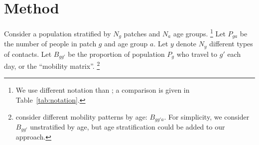 \section{Method}\label{meth}
Consider a population stratified by $N_g$ patches and $N_a$ age groups.%
\footnote{We use different notation than \citet{Arenas2020};
  a comparison is given in Table~\ref{tab:notation}.}
Let $P_{ga}$ be the number of people in patch $g$ and age group $a$.
Let $y$ denote $N_y$ different types of contacts.
Let $B_{gg'}$ be the proportion of population $P_{g}$ who travel to $g'$ each day,
or the ``mobility matrix''.%
\footnote{\citet{Arenas2020} consider different mobility patterns by age: $B_{gg'a}$.
  For simplicity, we consider $B_{gg'}$ unstratified by age,
  but age stratification could be added to our approach.}

